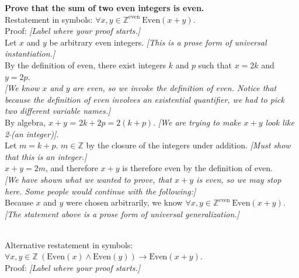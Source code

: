 \documentclass[10pt]{article}
\newcommand{\Z}{\mathbb{Z}}
\begin{document}
\textbf{Prove that the sum of two even integers is even.}
\\

Restatement in symbols: $\forall x,y \in \Z^{\textrm{even}} \ \textrm{Even}(x+y)$.
\\

Proof: \hfill \textit{[Label where your proof starts.]} \\

Let $x$ and $y$ be arbitrary even integers. \hfill \textit{[This is a prose form of universal instantiation.]}\\

By the definition of even, there exist integers $k$ and $p$ such that $x=2k$ and $y=2p$.\\

 \textit{[We know $x$ and $y$ are even, so we invoke the definition of even.  Notice that because the definition of even involves an existential quantifier,
we had to pick two different variable names.]}\\

By algebra, $x+y$ = $2k+2p = 2(k+p)$. \hfill \textit{[We are trying to make $x+y$ look like 2$\cdot$(an integer)]}.\\

Let $m=k+p$.  $m \in \Z$ by the closure of the integers under addition. \hfill \textit{[Must show that this is an integer.]}\\

$x+y=2m$, and therefore $x+y$ is therefore even by the definition of even. \\

\textit{[We have shown what we wanted to prove, that $x+y$ is even, so we may stop here.  Some people would continue with the following:]}\\

Because $x$ and $y$ were chosen arbitrarily, we know $\forall x,y \in \Z^{\textrm{even}} \ \textrm{Even}(x+y)$. \\

\textit{[The statement above is a prose form of universal generalization.]}

\noindent\makebox[\linewidth]{\rule{\textwidth}{0.4pt}} \\



Alternative restatement in symbols: $\forall x,y \in \Z \ (\textrm{Even}(x) \land \textrm{Even}(y)) \to \textrm{Even}(x+y)$.
\\

Proof: \hfill \textit{[Label where your proof starts.]} \\
\end{document}
